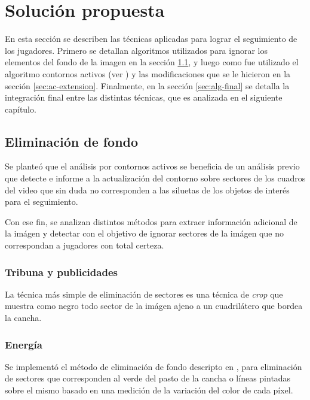 \chapter{Solución propuesta}
\label{chap-solution}

En esta sección se describen las técnicas aplicadas para lograr el seguimiento
de los jugadores. Primero se detallan algoritmos utilizados para ignorar los
elementos del fondo de la imagen en la sección
\ref{sec:background-elimination}, y luego como fue utilizado el algoritmo
contornos activos (ver \cite{fast-level-set}) y las modificaciones que se le
hicieron en la sección \ref{sec:ac-extension}. Finalmente, en la sección
\ref{sec:alg-final} se detalla la integración final entre las distintas
técnicas, que es analizada en el siguiente capítulo.

\section{Eliminación de fondo}

\label{sec:background-elimination}
Se planteó que el análisis por contornos activos se beneficia de un análisis
previo que detecte e informe a la actualización del contorno sobre sectores de
los cuadros del video que sin duda no corresponden a las siluetas de los
objetos de interés para el seguimiento.

Con ese fin, se analizan distintos métodos para extraer información adicional
de la imágen y detectar con el objetivo de ignorar sectores de la imágen que
no correspondan a jugadores con total certeza.

\subsection{Tribuna y publicidades}

La técnica más simple de eliminación de sectores es una técnica de
\textit{crop} que muestra como negro todo sector de la imágen ajeno a un
cuadrilátero que bordea la cancha.


\subsection{Energía}

Se implementó el método de eliminación de fondo descripto en
\cite{papers-tanos}, para eliminación de sectores que corresponden al
verde del pasto de la cancha o líneas pintadas sobre el mismo basado
en una medición de la variación del color de cada píxel.

